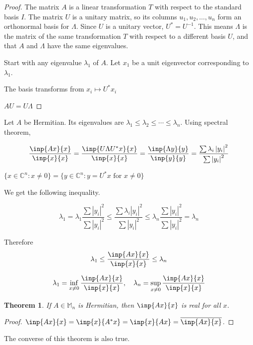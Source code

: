 \documentclass[twofold]{article}
\newcommand*\conj[1]{\overline{#1}}
\newcommand*\adj[1]{#1^*}
\newcommand*\abs[1]{\left \vert #1 \right\vert}
\theoremstyle{plain}
\newtheorem{theorem}{Theorem}
\theoremstyle{definition}
\theoremstyle{remark}
\begin{document}
\begin{proof} 
The matrix \(A\) is a linear transformation \(T\) with respect to the standard basis \(I\). The matrix \(U\) is a unitary matrix, so its columns \(u_1, u_2, \ldots , u_n\) form an orthonormal basis for \(\Lambda\). Since \(U\) is a unitary vector, \(\adj{U} = U^{-1}\). This means \(\Lambda\) is the matrix of the same transformation \(T\) with respect to a different basis \(U\), and that \(A\) and \(\Lambda\) have the same eigenvalues.


Start with any eigenvalue \(\lambda_1\) of \(A\). Let \(x_1\) be a unit eigenvector corresponding to \(\lambda_1\).

The basis transforms from \(x_i \mapsto \adj{U}x_i\)

\(AU = U\Lambda\)

\end{proof}


Let \(A\) be Hermitian. Its eigenvalues are \(\lambda_1 \le \lambda_2 \le \cdots \le \lambda_n\). Using spectral theorem, 

\[\frac{\inp{Ax}{x}}{\inp{x}{x}}  = \frac{\inp{U\Lambda \adj{U}x}{x}}{\inp{x}{x}} = \frac{\inp{\Lambda y}{y}}{\inp{y}{y}} = \frac{\sum \lambda_i \abs{y_i}^2}{\sum \abs{y_i}^2}\]

\(\{x \in \mathbb{C}^n : x \ne 0\} = \{y \in \mathbb{C}^n : y = \adj{U} x \text{ for } x \ne 0 \} \) 


We get the following inequality. 

\[\lambda_1 = \lambda_1 \frac{\sum \abs{y_i}^2}{\sum \abs{y_i}^2} \le \frac{\sum \lambda_i \abs{y_i}^2}{\sum \abs{y_i}^2} \le  \lambda_n \frac{\sum \abs{y_i}^2}{\sum \abs{y_i}^2} = \lambda_n\]

Therefore \[ \lambda_1 \le \frac{\inp{Ax}{x}}{\inp{x}{x}} \le \lambda_n\]

\[\lambda_1 = \inf _{x \ne 0} \frac{\inp{Ax}{x}}{\inp{x}{x}}, \quad \lambda_n = \sup_{x \ne 0} \frac{\inp{Ax}{x}}{\inp{x}{x}}\]




\begin{theorem} \label{hermit_real} If \(A \in \mathbb{M}_n\) is Hermitian, then \(\inp{Ax}{x}\) is real for all \(x\). \end{theorem}
\begin{proof} \(\inp{Ax}{x} = \inp{x}{\adj{A}x} = \inp{x}{Ax} = \conj{\inp{Ax}{x}}\). \end{proof}

The converse of this theorem is also true.
\end{document}
